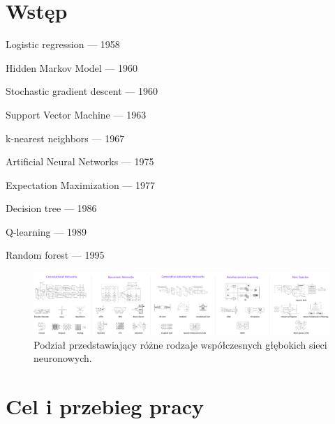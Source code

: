 \chapter{Wstęp}

Logistic regression — 1958 

Hidden Markov Model — 1960 

Stochastic gradient descent — 1960 

Support Vector Machine — 1963 

k-nearest neighbors — 1967 

Artificial Neural Networks — 1975 

Expectation Maximization — 1977 

Decision tree — 1986 

Q-learning — 1989 

Random forest — 1995 

\begin{figure}[h!]
	\centering
	\includegraphics[width=1.0\textwidth]{figures/rodzajeSieciNeuronowych.png}
	\caption{Podział przedstawiający różne rodzaje współczesnych głębokich sieci neuronowych.}
	\label{DLcambrianExplosion}
\end{figure}
\chapter{Cel i przebieg pracy}




